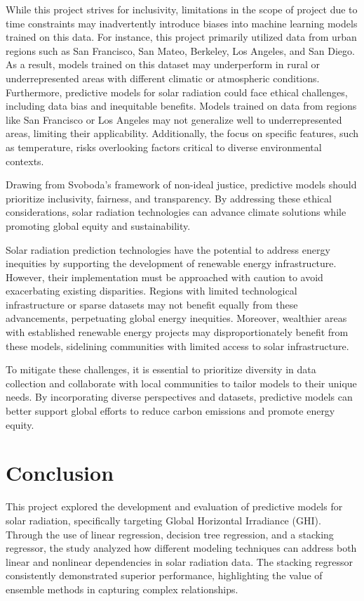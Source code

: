 \documentclass[10pt,twocolumn]{article}
\begin{document}
\begin{itemize}
While this project strives for inclusivity, limitations in the scope of project due to time constraints may inadvertently introduce biases into machine learning models trained on this data. For instance, this project primarily utilized data from urban regions such as San Francisco, San Mateo, Berkeley, Los Angeles, and San Diego. As a result, models trained on this dataset may underperform in rural or underrepresented areas with different climatic or atmospheric conditions.
Furthermore, predictive models for solar radiation could face ethical challenges, including data bias and inequitable benefits. Models trained on data from regions like San Francisco or Los Angeles may not generalize well to underrepresented areas, limiting their applicability. Additionally, the focus on specific features, such as temperature, risks overlooking factors critical to diverse environmental contexts.

Drawing from Svoboda’s framework of non-ideal justice, predictive models should prioritize inclusivity, fairness, and transparency\cite{11}. By addressing these ethical considerations, solar radiation technologies can advance climate solutions while promoting global equity and sustainability.



Solar radiation prediction technologies have the potential to address energy inequities by supporting the development of renewable energy infrastructure. However, their implementation must be approached with caution to avoid exacerbating existing disparities. Regions with limited technological infrastructure or sparse datasets may not benefit equally from these advancements, perpetuating global energy inequities. Moreover, wealthier areas with established renewable energy projects may disproportionately benefit from these models, sidelining communities with limited access to solar infrastructure.

To mitigate these challenges, it is essential to prioritize diversity in data collection and collaborate with local communities to tailor models to their unique needs. By incorporating diverse perspectives and datasets, predictive models can better support global efforts to reduce carbon emissions and promote energy equity.


\section{Conclusion}

This project explored the development and evaluation of predictive models for solar radiation, specifically targeting Global Horizontal Irradiance (GHI). Through the use of linear regression, decision tree regression, and a stacking regressor, the study analyzed how different modeling techniques can address both linear and nonlinear dependencies in solar radiation data. The stacking regressor consistently demonstrated superior performance, highlighting the value of ensemble methods in capturing complex relationships.


\end{itemize}
\end{document}
